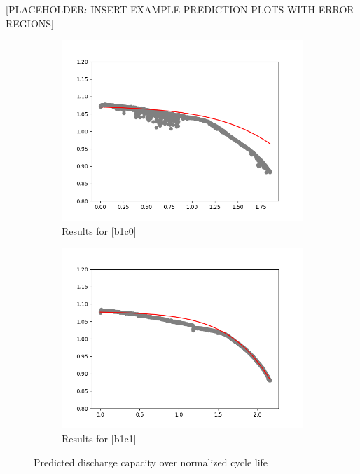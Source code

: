 \documentclass{article}
\begin{document}
[PLACEHOLDER: INSERT EXAMPLE PREDICTION PLOTS WITH ERROR REGIONS]
    \begin{figure}[H]
        \centering
        \begin{subfigure}[b]{0.49\linewidth}
            \includegraphics[width=\linewidth]{figs/bayes_plot_b1c0.png}
            \caption{Results for [b1c0]}
        \end{subfigure}
        \begin{subfigure}[b]{0.49\linewidth}
            \includegraphics[width=\linewidth]{figs/bayes_plot_b1c1.png}
            \caption{Results for [b1c1]}
        \end{subfigure}
        \caption{Predicted discharge capacity over normalized cycle life}
        \label{fig:bayespred}
    \end{figure}
\end{document}
